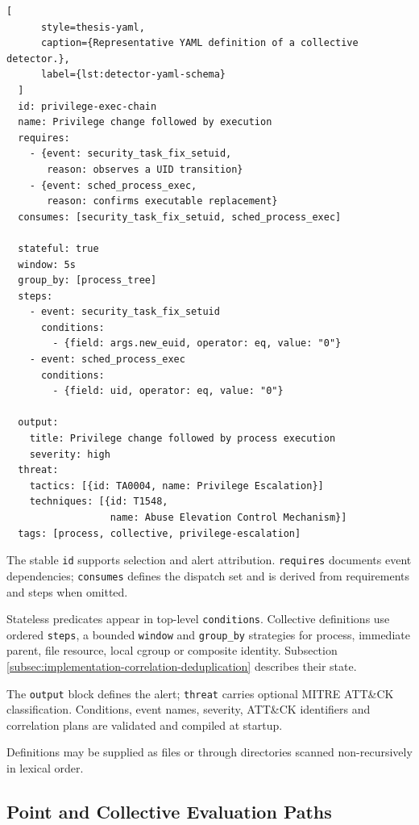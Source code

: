   \begin{lstlisting}[
      style=thesis-yaml,
      caption={Representative YAML definition of a collective detector.},
      label={lst:detector-yaml-schema}
  ]
  id: privilege-exec-chain
  name: Privilege change followed by execution
  requires:
    - {event: security_task_fix_setuid,
       reason: observes a UID transition}
    - {event: sched_process_exec,
       reason: confirms executable replacement}
  consumes: [security_task_fix_setuid, sched_process_exec]

  stateful: true
  window: 5s
  group_by: [process_tree]
  steps:
    - event: security_task_fix_setuid
      conditions:
        - {field: args.new_euid, operator: eq, value: "0"}
    - event: sched_process_exec
      conditions:
        - {field: uid, operator: eq, value: "0"}

  output:
    title: Privilege change followed by process execution
    severity: high
  threat:
    tactics: [{id: TA0004, name: Privilege Escalation}]
    techniques: [{id: T1548,
                  name: Abuse Elevation Control Mechanism}]
  tags: [process, collective, privilege-escalation]
  \end{lstlisting}

The stable \texttt{id} supports selection and alert attribution.
\texttt{requires} documents event dependencies; \texttt{consumes} defines the
dispatch set and is derived from requirements and steps when omitted.

Stateless predicates appear in top-level \texttt{conditions}. Collective
definitions use ordered \texttt{steps}, a bounded \texttt{window} and
\texttt{group\_by} strategies for process, immediate parent, file resource,
local cgroup or composite identity. Subsection
\ref{subsec:implementation-correlation-deduplication} describes their state.

The \texttt{output} block defines the alert; \texttt{threat} carries optional
MITRE ATT\&CK classification. Conditions, event names, severity, ATT\&CK
identifiers and correlation plans are validated and compiled at startup.

Definitions may be supplied as files or through directories scanned
non-recursively in lexical order.

\subsection{Point and Collective Evaluation Paths}
  \label{subsec:implementation-point-collective}

